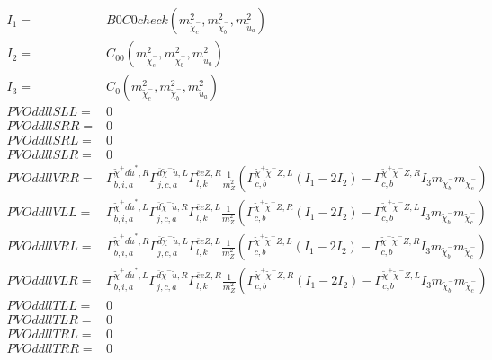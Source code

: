 \documentclass[A4,landscape]{article}
\begin{document}
\begin{align} 
I_1= & B0C0check(m^2_{\tilde{\chi}^-_{{c}}}, m^2_{\tilde{\chi}^-_{{b}}}, m^2_{\tilde{u}_{{a}}}) \\ 
I_2= & C_{00}(m^2_{\tilde{\chi}^-_{{c}}}, m^2_{\tilde{\chi}^-_{{b}}}, m^2_{\tilde{u}_{{a}}}) \\ 
I_3= & C_0(m^2_{\tilde{\chi}^-_{{c}}}, m^2_{\tilde{\chi}^-_{{b}}}, m^2_{\tilde{u}_{{a}}}) \\ 
  PVOddllSLL= & 0 \\ 
  PVOddllSRR= & 0 \\ 
  PVOddllSRL= & 0 \\ 
  PVOddllSLR= & 0 \\ 
  PVOddllVRR= &  \Gamma^{\tilde{\chi}^+d \tilde{u}^*,R}_{b, i, a} \Gamma^{\bar{d}\tilde{\chi}^- \tilde{u} ,L}_{j, c, a} \Gamma^{\bar{e}e Z ,R}_{l, k} \frac{1}{m^2_{Z}} (\Gamma^{\tilde{\chi}^+\tilde{\chi}^- Z ,L}_{c, b} (I_1 - 2 I_2) - \Gamma^{\tilde{\chi}^+\tilde{\chi}^- Z ,R}_{c, b} I_3 m_{\tilde{\chi}^-_{{b}}} m_{\tilde{\chi}^-_{{c}}}) \\ 
  PVOddllVLL= &  \Gamma^{\tilde{\chi}^+d \tilde{u}^*,L}_{b, i, a} \Gamma^{\bar{d}\tilde{\chi}^- \tilde{u} ,R}_{j, c, a} \Gamma^{\bar{e}e Z ,L}_{l, k} \frac{1}{m^2_{Z}} (\Gamma^{\tilde{\chi}^+\tilde{\chi}^- Z ,R}_{c, b} (I_1 - 2 I_2) - \Gamma^{\tilde{\chi}^+\tilde{\chi}^- Z ,L}_{c, b} I_3 m_{\tilde{\chi}^-_{{b}}} m_{\tilde{\chi}^-_{{c}}}) \\ 
  PVOddllVRL= &  \Gamma^{\tilde{\chi}^+d \tilde{u}^*,R}_{b, i, a} \Gamma^{\bar{d}\tilde{\chi}^- \tilde{u} ,L}_{j, c, a} \Gamma^{\bar{e}e Z ,L}_{l, k} \frac{1}{m^2_{Z}} (\Gamma^{\tilde{\chi}^+\tilde{\chi}^- Z ,L}_{c, b} (I_1 - 2 I_2) - \Gamma^{\tilde{\chi}^+\tilde{\chi}^- Z ,R}_{c, b} I_3 m_{\tilde{\chi}^-_{{b}}} m_{\tilde{\chi}^-_{{c}}}) \\ 
  PVOddllVLR= &  \Gamma^{\tilde{\chi}^+d \tilde{u}^*,L}_{b, i, a} \Gamma^{\bar{d}\tilde{\chi}^- \tilde{u} ,R}_{j, c, a} \Gamma^{\bar{e}e Z ,R}_{l, k} \frac{1}{m^2_{Z}} (\Gamma^{\tilde{\chi}^+\tilde{\chi}^- Z ,R}_{c, b} (I_1 - 2 I_2) - \Gamma^{\tilde{\chi}^+\tilde{\chi}^- Z ,L}_{c, b} I_3 m_{\tilde{\chi}^-_{{b}}} m_{\tilde{\chi}^-_{{c}}}) \\ 
  PVOddllTLL= & 0 \\ 
  PVOddllTLR= & 0 \\ 
  PVOddllTRL= & 0 \\ 
  PVOddllTRR= & 0 \\ 
\end{align} 
\end{document}

